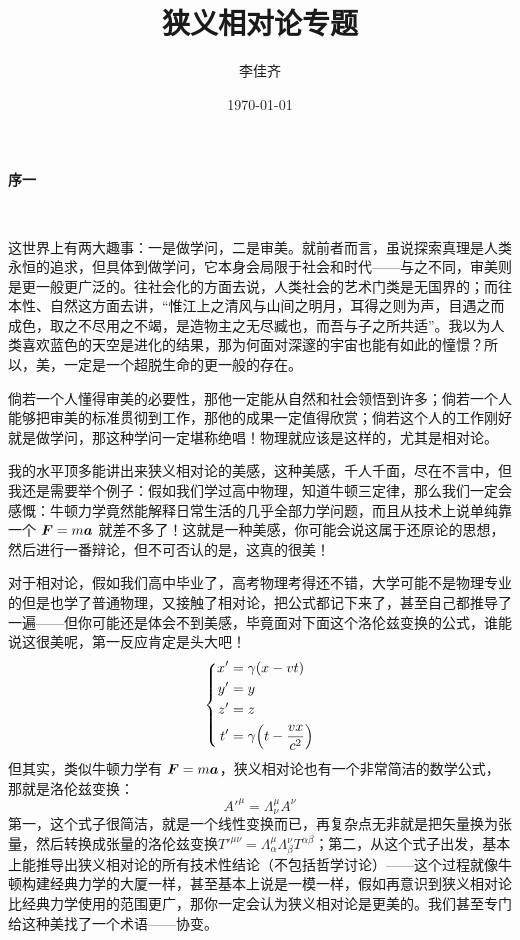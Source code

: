 \documentclass[12pt, a4paper, oneside]{ctexbook}
\title{{\Huge{\textbf{狭义相对论专题}}}}
\author{李佳齐}
\date{\today}
\begin{document}
	
\maketitle

\setcounter{page}{1}

\begin{center}
	\Huge\textbf{序一}
\end{center}~\

这世界上有两大趣事：一是做学问，二是审美。就前者而言，虽说探索真理是人类永恒的追求，但具体到做学问，它本身会局限于社会和时代——与之不同，审美则是更一般更广泛的。往社会化的方面去说，人类社会的艺术门类是无国界的；而往本性、自然这方面去讲，“惟江上之清风与山间之明月，耳得之则为声，目遇之而成色，取之不尽用之不竭，是造物主之无尽臧也，而吾与子之所共适”。我以为人类喜欢蓝色的天空是进化的结果，那为何面对深邃的宇宙也能有如此的憧憬？所以，美，一定是一个超脱生命的更一般的存在。\par 
倘若一个人懂得审美的必要性，那他一定能从自然和社会领悟到许多；倘若一个人能够把审美的标准贯彻到工作，那他的成果一定值得欣赏；倘若这个人的工作刚好就是做学问，那这种学问一定堪称绝唱！物理就应该是这样的，尤其是相对论。\par 
我的水平顶多能讲出来狭义相对论的美感，这种美感，千人千面，尽在不言中，但我还是需要举个例子：假如我们学过高中物理，知道牛顿三定律，那么我们一定会感慨：牛顿力学竟然能解释日常生活的几乎全部力学问题，而且从技术上说单纯靠一个 $\vb*{F}=m\vb*{a}$ 就差不多了！这就是一种美感，你可能会说这属于还原论的思想，然后进行一番辩论，但不可否认的是，这真的很美！\par 
对于相对论，假如我们高中毕业了，高考物理考得还不错，大学可能不是物理专业的但是也学了普通物理，又接触了相对论，把公式都记下来了，甚至自己都推导了一遍——但你可能还是体会不到美感，毕竟面对下面这个洛伦兹变换的公式，谁能说这很美呢，第一反应肯定是头大吧！
\begin{equation}\label{e1}
	\left\{
	\begin{aligned}
		x'&=\gamma(x-vt)\\
		y'&=y\\
		z'&=z\\
		t'&=\gamma\qty(t-\dfrac{vx}{c^{2}})
	\end{aligned}
	\right.
\end{equation}
但其实，类似牛顿力学有 $\vb*{F}=m\vb*{a}$，狭义相对论也有一个非常简洁的数学公式，那就是洛伦兹变换：
\begin{equation}
	A'^{\mu}=\Lambda^{\mu}_{\nu}A^{\nu}
\end{equation}
第一，这个式子很简洁，就是一个线性变换而已，再复杂点无非就是把矢量换为张量，然后转换成张量的洛伦兹变换$T'^{\mu\nu}=\Lambda^{\mu}_{\alpha}\Lambda^{\nu}_{\beta}T^{\alpha\beta}$；第二，从这个式子出发，基本上能推导出狭义相对论的所有技术性结论（不包括哲学讨论）——这个过程就像牛顿构建经典力学的大厦一样，甚至基本上说是一模一样，假如再意识到狭义相对论比经典力学使用的范围更广，那你一定会认为狭义相对论是更美的。我们甚至专门给这种美找了一个术语——协变。\par 
\end{document}
